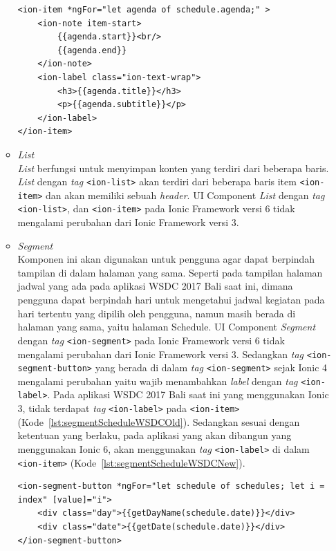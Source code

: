 \begin{enumerate}
\begin{itemize}
\begin{lstlisting}[label={lst:itemScheduleWSDCNew}, caption=\textit{Tag} <ion-item> dengan Ionic 6 di Aplikasi WSDC 2017 Bali yang Akan dibuat]
<ion-item *ngFor="let agenda of schedule.agenda;" >
	<ion-note item-start>
    	{{agenda.start}}<br/> 
        {{agenda.end}}
   	</ion-note>
    <ion-label class="ion-text-wrap">
    	<h3>{{agenda.title}}</h3>
        <p>{{agenda.subtitle}}</p>
    </ion-label>
</ion-item>
\end{lstlisting}
			
			\item \textit{List} \\
			\textit{List} berfungsi untuk menyimpan konten yang terdiri dari beberapa baris. \textit{List} dengan \textit{tag} \texttt{<ion-list>} akan terdiri dari beberapa baris item \texttt{<ion-item>} dan akan memiliki sebuah \textit{header}. UI Component \textit{List} dengan \textit{tag} \texttt{<ion-list>}, dan \texttt{<ion-item>} pada Ionic Framework versi 6 tidak mengalami perubahan dari Ionic Framework versi 3.	
		
			\item \textit{Segment} \\
		Komponen ini akan digunakan untuk pengguna agar dapat berpindah tampilan di dalam halaman yang sama. Seperti pada tampilan halaman jadwal yang ada pada aplikasi WSDC 2017 Bali saat ini, dimana pengguna dapat berpindah hari untuk mengetahui jadwal kegiatan pada hari tertentu yang dipilih oleh pengguna, namun masih berada di halaman yang sama, yaitu halaman Schedule. UI Component \textit{Segment} dengan \textit{tag} \texttt{<ion-segment>} pada Ionic Framework versi 6 tidak mengalami perubahan dari Ionic Framework versi 3.
		Sedangkan \textit{tag} \texttt{<ion-segment-button>} yang berada di dalam \textit{tag} \texttt{<ion-segment>} sejak Ionic 4 mengalami perubahan yaitu wajib menambahkan \textit{label} dengan \textit{tag} \texttt{<ion-label>}. Pada aplikasi WSDC 2017 Bali saat ini yang menggunakan Ionic 3, tidak terdapat \textit{tag} \texttt{<ion-label>} pada \texttt{<ion-item>} (Kode~\ref{lst:segmentScheduleWSDCOld}). Sedangkan sesuai dengan ketentuan yang berlaku, pada aplikasi yang akan dibangun yang menggunakan Ionic 6, akan menggunakan \textit{tag} \texttt{<ion-label>} di dalam \texttt{<ion-item>} (Kode~\ref{lst:segmentScheduleWSDCNew}).
		
\begin{lstlisting}[label={lst:segmentScheduleWSDCOld}, caption=\textit{Tag} <ion-segment-button> dengan Ionic 3 di Aplikasi WSDC 2017 Bali Saat Ini]
<ion-segment-button *ngFor="let schedule of schedules; let i = index" [value]="i">
	<div class="day">{{getDayName(schedule.date)}}</div>
	<div class="date">{{getDate(schedule.date)}}</div>
</ion-segment-button>
\end{lstlisting}


\end{itemize}
\end{enumerate}
